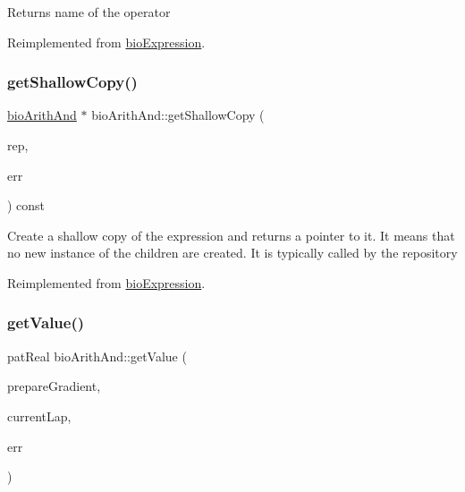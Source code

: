 \begin{DoxyReturn}{Returns}
name of the operator 
\end{DoxyReturn}


Reimplemented from \hyperlink{classbio_expression_a2353a4afb3a2b0af7c63aba086a72bde}{bio\+Expression}.

\mbox{\label{classbio_arith_and_a3dfc8f4f9247158b3ff4c3d8e61b95ad}} 
\subsubsection{\texorpdfstring{get\+Shallow\+Copy()}{getShallowCopy()}}
{\footnotesize\ttfamily \hyperlink{classbio_arith_and}{bio\+Arith\+And} $\ast$ bio\+Arith\+And\+::get\+Shallow\+Copy (\begin{DoxyParamCaption}\item[{\hyperlink{classbio_expression_repository}{bio\+Expression\+Repository} $\ast$}]{rep,  }\item[{pat\+Error $\ast$\&}]{err }\end{DoxyParamCaption}) const\hspace{0.3cm}{\ttfamily [virtual]}}

Create a shallow copy of the expression and returns a pointer to it. It means that no new instance of the children are created. It is typically called by the repository 

Reimplemented from \hyperlink{classbio_expression_a442534762693b92baaf33928979a1bf8}{bio\+Expression}.

\mbox{\label{classbio_arith_and_a3e89f3ee81dd4703fd77e5b2da1e45ad}} 
\subsubsection{\texorpdfstring{get\+Value()}{getValue()}}
{\footnotesize\ttfamily pat\+Real bio\+Arith\+And\+::get\+Value (\begin{DoxyParamCaption}\item[{pat\+Boolean}]{prepare\+Gradient,  }\item[{pat\+U\+Long}]{current\+Lap,  }\item[{pat\+Error $\ast$\&}]{err }\end{DoxyParamCaption})\hspace{0.3cm}{\ttfamily [virtual]}}

